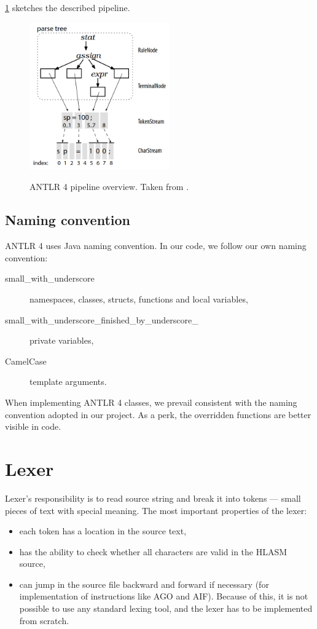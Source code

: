 \cref{antlr_pipeline} sketches the described pipeline.

\begin{figure}[H]
	\centering
	\includegraphics[width=6cm]{img/antlr_pipeline}
	\label{antlr_pipeline}
	\caption{ANTLR 4 pipeline overview. Taken from \cite{parr2013definitive}.}
\end{figure}

\subsection{Naming convention}
ANTLR 4 uses Java naming convention. In our code, we follow our own naming convention:

\begin{description}
	\item[small\_with\_underscore] namespaces, classes, structs, functions and local variables,
	\item[small\_with\_underscore\_finished\_by\_underscore\_] private variables,
	\item[CamelCase] template arguments.
\end{description} 

When implementing ANTLR 4 classes, we prevail consistent with the naming convention adopted in our project. As a perk, the overridden functions are better visible in code.

\section{Lexer}

Lexer's responsibility is to read source string and break it into tokens --- small pieces of text with special meaning. The most important properties of the lexer:
\begin{itemize}
	\item each token has a location in the source text,
	\item has the ability to check whether all characters are valid in the HLASM source,
	\item can jump in the source file backward and forward if necessary (for implementation of instructions like AGO and AIF). Because of this, it is not possible to use any standard lexing tool, and the lexer has to be implemented from scratch.
\end{itemize}

